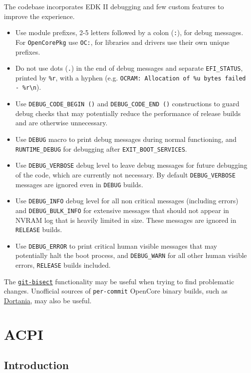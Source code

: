 \documentclass[]{article}
\providecommand{\tightlist}{%
  \setlength{\itemsep}{0pt}\setlength{\parskip}{0pt}}
\begin{document}
The codebase incorporates EDK II debugging and few custom features to improve the experience.
\begin{itemize}
\tightlist
\item Use module prefixes, 2-5 letters followed by a colon (\texttt{:}), for debug messages. For \texttt{OpenCorePkg}
use \texttt{OC:}, for libraries and drivers use their own unique prefixes.
\item Do not use dots (\texttt{.}) in the end of debug messages and separate \texttt{EFI\_STATUS}, printed by
\texttt{\%r}, with a hyphen (e.g. \texttt{OCRAM: Allocation of \%u bytes failed - \%r\textbackslash n}).
\item Use \texttt{DEBUG\_CODE\_BEGIN ()} and \texttt{DEBUG\_CODE\_END ()} constructions to guard debug checks
that may potentially reduce the performance of release builds and are otherwise unnecessary.
\item Use \texttt{DEBUG} macro to print debug messages during normal functioning, and \texttt{RUNTIME\_DEBUG} for
debugging after \texttt{EXIT\_BOOT\_SERVICES}.
\item Use \texttt{DEBUG\_VERBOSE} debug level to leave debug messages for future debugging of the code, which
are currently not necessary. By default \texttt{DEBUG\_VERBOSE} messages are ignored even in \texttt{DEBUG} builds.
\item Use \texttt{DEBUG\_INFO} debug level for all non critical messages (including errors)
and \texttt{DEBUG\_BULK\_INFO}
for extensive messages that should not appear in NVRAM log that is heavily limited in size.
These messages are ignored in \texttt{RELEASE} builds.
\item Use \texttt{DEBUG\_ERROR} to print critical human visible messages that may potentially halt the boot process,
and \texttt{DEBUG\_WARN} for all other human visible errors, \texttt{RELEASE} builds included.
\end{itemize}

The \href{https://git-scm.com/docs/git-bisect}{\texttt{git-bisect}} functionality may be useful when trying
to find problematic changes. Unofficial sources of \texttt{per-commit} OpenCore binary builds,
such as \href{https://dortania.github.io/builds}{Dortania}, may also be useful.

\section{ACPI}\label{acpi}

\subsection{Introduction}\label{acpiintro}
\end{document}
